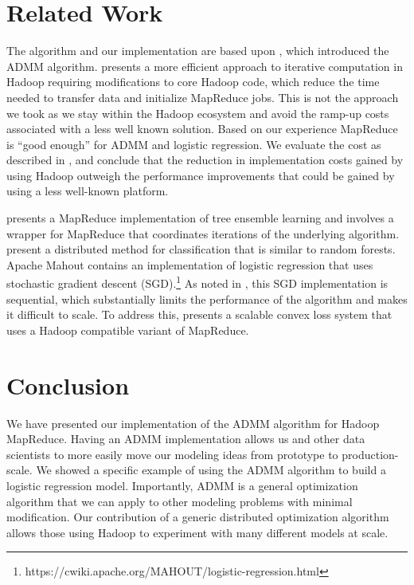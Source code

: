 \documentclass[10pt, conference, compsocconf]{IEEEtran}
\begin{document}
\section{Related Work}\label{sec:related}
The algorithm and our implementation are based upon \cite{boyd}, which introduced the ADMM algorithm.  \cite{bu2010} presents a more efficient approach to iterative computation in Hadoop requiring modifications to core Hadoop code, which reduce the time needed to transfer data and initialize MapReduce jobs.  This is not the approach we took as we stay within the Hadoop ecosystem and avoid the ramp-up costs associated with a less well known solution.  Based on our experience MapReduce is ``good enough'' for ADMM and logistic regression.  We evaluate the cost as described in \cite{lin2012}, and conclude that the reduction in implementation costs gained by using Hadoop outweigh the performance improvements that could be gained by using a less well-known platform. 

\cite{planet} presents a MapReduce implementation of tree ensemble learning and involves a wrapper for MapReduce that coordinates iterations of the underlying algorithm.  \cite{linkolcz2012} present a distributed method for classification that is similar to random forests. Apache Mahout contains an implementation of logistic regression that uses stochastic gradient descent (SGD).\footnote{https://cwiki.apache.org/MAHOUT/logistic-regression.html}  As noted in \cite{agarwal2011}, this SGD implementation is sequential, which substantially limits the performance of the algorithm and makes it difficult to scale.  To address this, \cite{agarwal2011} presents a scalable convex loss system that uses a Hadoop compatible variant of MapReduce.

\section{Conclusion}\label{sec:conc}
We have presented our implementation of the ADMM algorithm for Hadoop MapReduce.  Having an ADMM implementation allows us and other data scientists to more easily move our modeling ideas from prototype to production-scale.  We showed a specific example of using the ADMM algorithm to build a logistic regression model.  Importantly, ADMM is a general optimization algorithm that we can apply to other modeling problems with minimal modification.  Our contribution of a generic distributed optimization algorithm allows those using Hadoop to experiment with many different models at scale.
\end{document}
